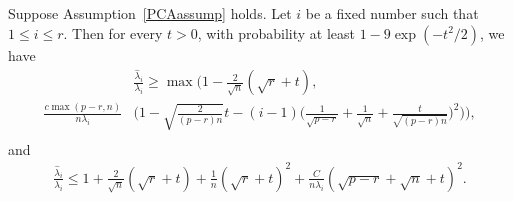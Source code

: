 \begin{theorem}\label{PCATheoremEigenvalue}
    Suppose Assumption~\ref{PCAassump} holds.
    Let $i$ be a fixed number such that $1 \leq i\leq r$. Then for every $t>0$, with probability at least $1-9\exp(-t^2/2)$, we have
    \begin{equation*}
        \begin{split}
            &\frac{\hat{\lambda}_i}{\lambda_i}\geq 
            \max \Big(1-\frac{2}{\sqrt{n}}(\sqrt{r}+t),\\
            \frac{c\max(p-r,n)}{n\lambda_i} &\big( 1-\sqrt{\frac{2}{(p-r)n}}t-(i-1)\big(\frac{1}{\sqrt{p-r}}+\frac{1}{\sqrt{n}}+\frac{t}{\sqrt{(p-r)n}}\big)^2 \big) \Big),\\
        \end{split}
    \end{equation*}
    and
    \begin{equation*}
        \begin{split}
            \frac{\hat{\lambda}_i}{\lambda_i}\leq 
        1+\frac{2}{\sqrt{n}}(\sqrt{r}+t)+\frac{1}{n}(\sqrt{r}+t)^2+
        \frac{C}{n\lambda_i} (\sqrt{p-r}+\sqrt{n}+t)^2.
        \end{split}
    \end{equation*}


\end{theorem}
